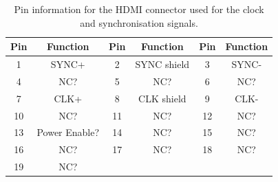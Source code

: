 \documentclass[a4paper]{article}
\begin{document}
\begin{table}[h]
    \begin{center}
        \caption{Pin information for the HDMI connector used for the clock and synchronisation signals.}
        \label{tab:ClockSyncPins}
        \begin{tabular}{cc|cc|cc}
            \hline
            \hline
            Pin & Function & Pin & Function & Pin & Function \\
            \hline
            1 & SYNC+ & 2 & SYNC shield  & 3 & SYNC- \\
            4 & NC? & 5 & NC? & 6 & NC? \\
            7 & CLK+ & 8 & CLK shield & 9 & CLK- \\
            10 & NC? & 11 & NC? & 12 & NC? \\
            13 & Power Enable? & 14 & NC? & 15 & NC? \\
            16 & NC? & 17 & NC? & 18 & NC? \\
            19 & NC? & & & & \\
            \hline
            \hline
        \end{tabular}
    \end{center}
\end{table}
\end{document}
